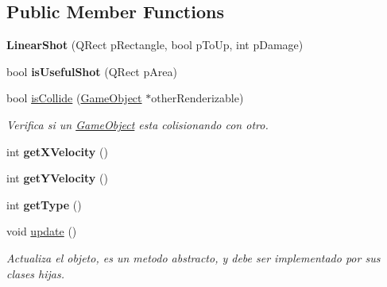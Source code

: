 \subsection*{Public Member Functions}
\begin{DoxyCompactItemize}
\item 
\hypertarget{class_linear_shot_a353b1988983a192affd6913805b8403e}{{\bfseries Linear\-Shot} (Q\-Rect p\-Rectangle, bool p\-To\-Up, int p\-Damage)}\label{class_linear_shot_a353b1988983a192affd6913805b8403e}

\item 
\hypertarget{class_linear_shot_af5e24419776495f3b42381fe614a3bec}{bool {\bfseries is\-Useful\-Shot} (Q\-Rect p\-Area)}\label{class_linear_shot_af5e24419776495f3b42381fe614a3bec}

\item 
bool \hyperlink{class_linear_shot_a5f74863ef2fe90a8e524945737029e0a}{is\-Collide} (\hyperlink{class_game_object}{Game\-Object} $\ast$other\-Renderizable)
\begin{DoxyCompactList}\small\item\em Verifica si un \hyperlink{class_game_object}{Game\-Object} esta colisionando con otro. \end{DoxyCompactList}\item 
\hypertarget{class_linear_shot_a9f7b9d654314185d6d89c8c24a64bc85}{int {\bfseries get\-X\-Velocity} ()}\label{class_linear_shot_a9f7b9d654314185d6d89c8c24a64bc85}

\item 
\hypertarget{class_linear_shot_ad0b2c8f2e67c4c8bf48895616c9f5683}{int {\bfseries get\-Y\-Velocity} ()}\label{class_linear_shot_ad0b2c8f2e67c4c8bf48895616c9f5683}

\item 
\hypertarget{class_linear_shot_a50717d095ffb35f445f909f0ef961a5a}{int {\bfseries get\-Type} ()}\label{class_linear_shot_a50717d095ffb35f445f909f0ef961a5a}

\item 
\hypertarget{class_linear_shot_a7f0ae98813020ba9c1860f24750b6fcf}{void \hyperlink{class_linear_shot_a7f0ae98813020ba9c1860f24750b6fcf}{update} ()}\label{class_linear_shot_a7f0ae98813020ba9c1860f24750b6fcf}

\begin{DoxyCompactList}\small\item\em Actualiza el objeto, es un metodo abstracto, y debe ser implementado por sus clases hijas. \end{DoxyCompactList}\end{DoxyCompactItemize}
